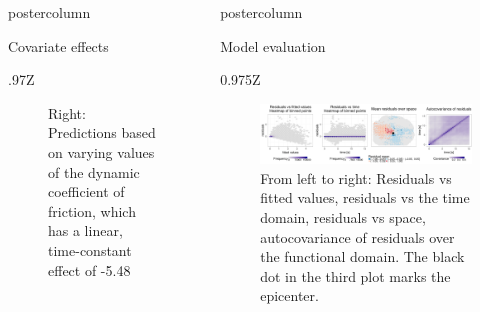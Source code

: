 \documentclass[final,hyperref={pdfpagelabels=false}]{beamer}
\newcommand*\circled[1]{\tikz[baseline=(char.base)]{
\node[shape=circle,draw,inner sep=2pt] (char) {#1};}}
\begin{document}
\begin{frame}
\begin{columns}
\begin{column}{1\textwidth}
\begin{columns}[T]
\begin{column}{.484\textwidth}
\begin{beamercolorbox}[center,wd=\textwidth]{postercolumn}
\begin{minipage}[T]{.95\textwidth}
\begin{block}{\footnotesize \circled{2} Covariate effects}
\begin{center}
\begin{tabularx}{.97\textwidth}{Z}
\begin{figure}[!ht]
{Right: Predictions based on varying values of the dynamic coefficient of friction, which has a linear, time-constant effect of -5.48 \\
}
\end{figure}
\end{tabularx}
\end{center}
\vspace{-3ex}
\end{block}



\end{minipage}
\end{beamercolorbox}
\end{column}

\begin{column}{.484\textwidth}
\begin{beamercolorbox}[center,wd=\textwidth]{postercolumn}
\begin{minipage}[T]{.95\textwidth}  %


\begin{block}{\footnotesize \circled{3} Model evaluation}
\vspace{-3ex}
\begin{center}
\begin{tabularx}{0.975\linewidth}{Z}
  \begin{figure}[!ht]\centering
  \includegraphics[width=0.8\linewidth]{figures/Residuen}
  \caption{\footnotesize From left to right: Residuals vs fitted values, residuals vs the time domain, residuals vs space, autocovariance of residuals over the functional domain. The black dot in the third plot marks the epicenter.}
  \end{figure}
\end{tabularx}
\end{center}

\vspace{-5ex}


\end{block}
\end{minipage}
\end{beamercolorbox}
\end{column}
\end{columns}
\end{column}
\end{columns}
\end{frame}
\end{document}

